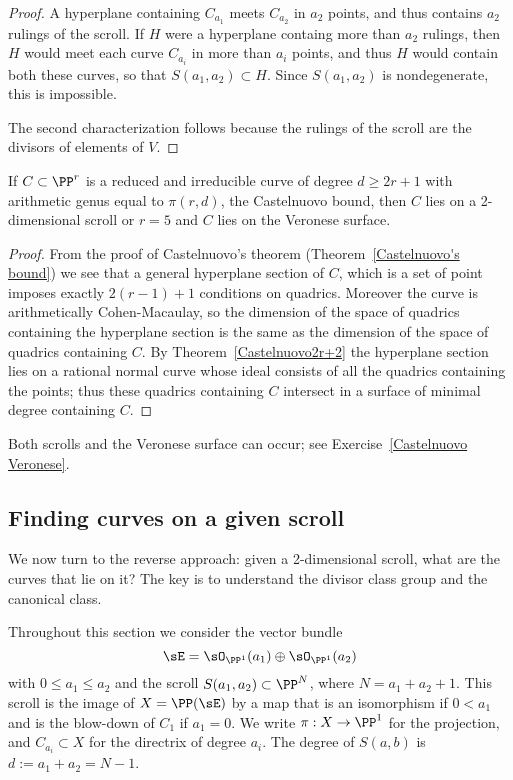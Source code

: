\begin{proof}
A hyperplane containing $C_{a_1}$ meets $C_{a_2}$ in $a_2$
points, and thus contains $a_2$ rulings of the scroll. If $H$ were a hyperplane containg more than $a_2$
rulings, then $H$ would meet each curve $C_{a_i}$ in more than $a_i$ points, and thus $H$ would contain
both these curves, so that $S(a_1,a_2)\subset H$. Since $S(a_1,a_2)$ is nondegenerate, this is impossible.

The second characterization follows because the rulings of the scroll are the divisors of elements of $V.$
\end{proof}


\begin{theorem}\label{Castelnuovo examples}
If $C\subset \PP^r$ is a reduced and irreducible curve of degree $d\geq 2r+1$ with arithmetic genus equal to $\pi(r,d)$, the
Castelnuovo bound, then $C$ lies on a 2-dimensional scroll or $r=5$ and $C$ lies on  the Veronese surface.
\end{theorem}

\begin{proof}
From the proof of Castelnuovo's theorem (Theorem~\ref{Castelnuovo's bound}) we see that a general hyperplane
section of $C$, which is a set of point imposes exactly $2(r-1)+1$ conditions on quadrics. Moreover the curve
is arithmetically Cohen-Macaulay, so the dimension of the space of quadrics containing the hyperplane section
is the same as the dimension of the space of quadrics containing $C$. By Theorem~\ref{Castelnuovo2r+2} the hyperplane
section lies on a rational normal curve whose ideal consists of all the quadrics containing the points;
thus these quadrics containing $C$ intersect in a surface of minimal degree containing $C$.
\end{proof}

Both scrolls and the Veronese surface can occur; see Exercise~\ref{Castelnuovo Veronese}.

\subsection{Finding curves on a given scroll}

We now turn to the reverse approach: given a 2-dimensional scroll, what are the curves that lie on it?
The key is to understand the divisor class group and the canonical class.

 Throughout this section we consider the vector bundle 
$$
\sE = \sO_{\PP^1}(a_1) \oplus\sO_{\PP^1}(a_2)
$$
with $0\leq a_1\leq a_2$ and the 
scroll $ S(a_1, a_2) \subset \PP^N$, where $N = a_1+a_2+1$. This scroll is the image of $X = \PP(\sE)$ by a map that is an isomorphism
if $0<a_1$ and is the blow-down of  $C_1$ if $a_1=0$.  We write $\pi:X \to \PP^1$ for the projection, and
$C_{a_i}\subset X$ for the directrix of degree $a_i$. The degree of $S(a,b)$ is $d := a_1+a_2 = N-1$.

